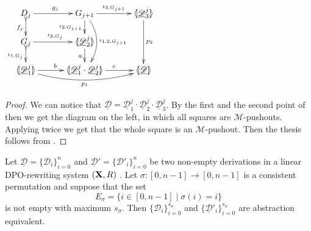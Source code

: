 \documentclass[a4paper,UKenglish,cleveref,pdftex,thm-restate,numberwithinsect]{lipics-v2021}
\def\R{\mathsf{R}}
\def\X{\textbf {\textup{X}}}
\newcommand{\dder}[1]{\mathscr{#1}}
\newcommand{\der}[1]{\underline{\dder{#1}}}
\newcommand{\lpro}{\langle \hspace{-1.85pt}[}
\newcommand{\rpro}{]\hspace{-1.85pt}\rangle}
\newcommand{\tpro}[1]{\lpro \der{#1}\rpro}
\begin{document}
\noindent 
\parbox{5cm}{\vspace{1em}$
\xymatrix@C=30pt@R=15pt{D_{j} \ar[r]^{g_j}\ar@{>->}[d]_{f_j}& G_{j+1}
	\ar[r]^-{\iota_{3,G_{j+1}}} \ar[d]_{\iota_{2, G_{j+1}}}
	\ar@/^.5cm/[dd]^{\iota_{1,2, G_{j+1}}}& \lpro \der{D}^j_3\rpro
	\ar[dd]^{p_2} \\ G_j \ar[r]^{\iota_{2,
			G_j}}\ar@{>->}[d]_{\iota_{1,G_j}} & \lpro \der{D}^j_2\rpro
	\ar[d]_a\\ \lpro \der{D}^j_1 \rpro \ar@/_.4cm/[rr]_{p_1}
	\ar[r]^b &\lpro \der{D}^j_1\cdot \der{D}^j_2 \rpro
	\ar[r]^c&\tpro{D} }$}\qquad  \qquad
\parbox{7.5cm}{\begin{proof}
	We can notice that
	$\der{D}=\der{D}^j_1\cdot \der{D}^j_2 \cdot \der{D}^j_3$. By the
	first and the second point of  then we get the
	 diagram on the left, in which all squares are $\mathcal{M}$-pushouts. Applying  twice we get that the whole square is an
	$\mathcal{M}$-pushout. Then the thesis follows from
	.
\end{proof}}


\begin{lemma}\label{lem:idevero}
	Let $\der{D}=\{\dder{D}_{i}\}_{i=0}^n$ and $\der{D}'=\{\dder{D}'_i\}_{i=0}^n$ be two non-empty derivations in a linear DPO-rewriting system $(\X, \R)$ . Let  $\sigma:[0,n-1]\to [0,n-1]$  is a consistent permutation and suppose that the set 
	\[E_{\sigma}=\{i\in [0,n-1]\mid \sigma(i)=i\}\]
	is not empty with maximum $s_\sigma$. Then $\{\dder{D}_i\}_{i=0}^{s_\sigma}$ and $\{\der{D}'_i\}_{i=0}^{s_\sigma}$ are abstraction equivalent.  
\end{lemma}
\end{document}
